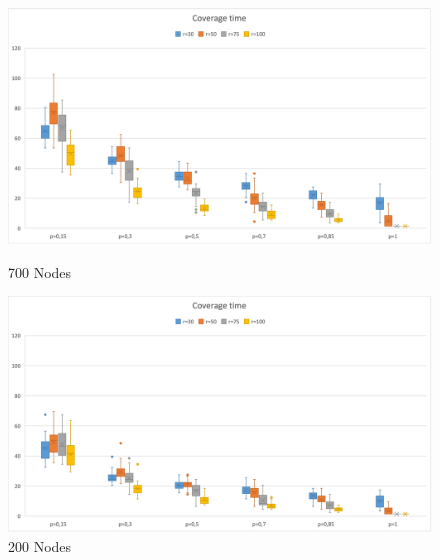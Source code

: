 \begin{figure}[H]
  \includegraphics[width=\linewidth]{./images/Time700Boxplot.png}
  \caption{700 Nodes}\label{fig:coverage-time-700}
\endminipage\hfill
{}
  \includegraphics[width=\linewidth]{./images/Time200BoxplotScaled.png}
  \caption{200 Nodes}\label{fig:awesome_image2}
\endminipage
\end{figure}

